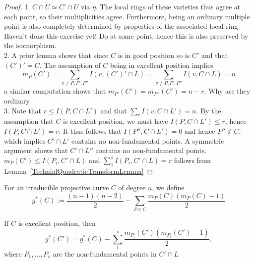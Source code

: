     \begin{proof}
        1. $C\cap U\simeq C'\cap U$ via $\eta$. The local rings of these varieties thus agree at each point, so their multiplicities agree. Furthermore, being an ordinary multiple point is also completely determined by properties of the associated local ring {\Large Haven't done this exercise yet! Do at some point}, hence this is also preserved by the isomorphism.\\
        2. A prior lemma shows that since $C$ is in good position so is $C'$ and that $(C')'=C$. The assumption of $C$ being in excellent position implies 
        $$
            m_P(C') = \sum_{v\neq P,P',P''} I(v,(C')'\cap L)= \sum_{v\neq P,P',P''} I(v,C\cap L)= n
        $$
        a similar computation shows that $m_{P'}(C')=m_{P''}(C')=n-r$. {\Large Why are they ordinary}\\
        3. Note that $r\leq I(P,C\cap L')$ and that $\sum_v I(v,C\cap L') = n$. By the assumption that $C$ is excellent position, we must have $I(P,C\cap L') \leq r$, hence $I(P,C\cap L')=r$. It thus follows that $I(P'',C\cap L')=0$ and hence $P''\notin C$, which implies $C'\cap L'$ contains no non-fundamental points. A symmetric argument shows that $C'\cap L''$ contains no non-fundamental points.  $m_P(C')\leq I(P_i,C'\cap L)$ and $\sum_1^s I(P_i, C'\cap L)=r$ follows from Lemma~\ref{TechnialQuadraticTransformLemma}
    \end{proof}
    \begin{definition}
        For an irreducible projective curve $C$ of degree $n$, we define 
        $$
            g^\ast(C) := \frac{(n-1)(n-2)}{2}-\sum_{P\in C}\frac{m_P(C)(m_P(C)-1)}{2}
        $$
    \end{definition}
    \begin{lemma}
        If $C$ is excellent position, then 
        $$
            g^\ast(C')= g^\ast(C)-\sum_1^s \frac{m_{P_i}(C')(m_{P_i}(C')-1)}{2},
        $$
        where $P_1,\dots,P_s$ are the non-fundamental points in $C'\cap L$ 
    \end{lemma}
